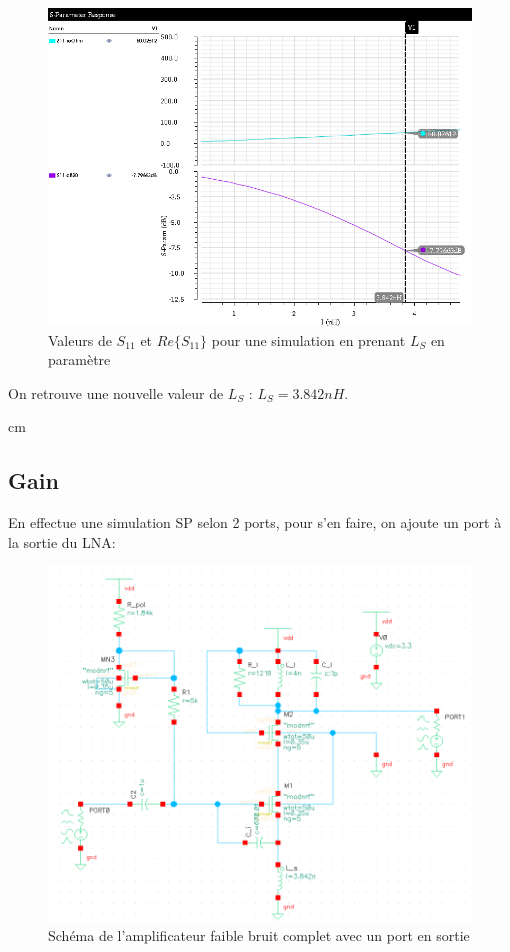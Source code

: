 \documentclass[a4paper]{article}
\begin{document}
\begin{figure}[!htb]
\begin{center}
  \includegraphics[scale=0.45]{Q3-newLs.png}
  \caption{Valeurs de $S_{11}$ et $Re\{S_{11}\}$ pour une simulation en prenant $L_S$ en param\`etre}
  \label{newLS}
\end{center}
\end{figure}

On retrouve une nouvelle valeur de $L_S$ : $L_S = 3.842 nH$.

 cm

\subsection{Gain}
En effectue une simulation SP selon 2 ports, pour s'en faire, on ajoute un port \`a la sortie du LNA:

\begin{figure}[!htb]
\begin{center}
  \includegraphics[scale=0.30]{schematic_lna_global.png}
  \caption{Sch\'ema de l'amplificateur faible bruit complet avec un port en sortie}
  \label{schema-pol}
\end{center}
\end{figure}
\end{document}
